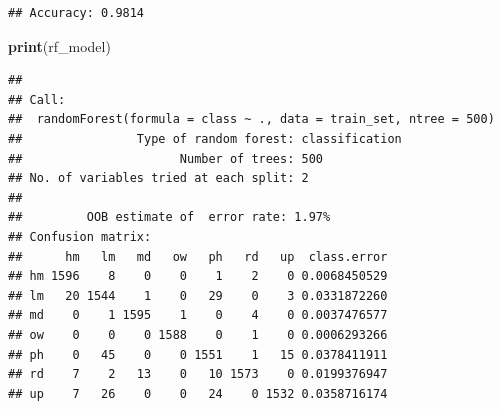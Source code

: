 \documentclass[
]{article}
\newenvironment{Shaded}{\begin{snugshade}}{\end{snugshade}}
\newcommand{\AttributeTok}[1]{\textcolor[rgb]{0.13,0.29,0.53}{#1}}
\newcommand{\CommentTok}[1]{\textcolor[rgb]{0.56,0.35,0.01}{\textit{#1}}}
\newcommand{\DecValTok}[1]{\textcolor[rgb]{0.00,0.00,0.81}{#1}}
\newcommand{\FloatTok}[1]{\textcolor[rgb]{0.00,0.00,0.81}{#1}}
\newcommand{\FunctionTok}[1]{\textcolor[rgb]{0.13,0.29,0.53}{\textbf{#1}}}
\newcommand{\NormalTok}[1]{#1}
\newcommand{\OtherTok}[1]{\textcolor[rgb]{0.56,0.35,0.01}{#1}}
\newcommand{\SpecialCharTok}[1]{\textcolor[rgb]{0.81,0.36,0.00}{\textbf{#1}}}
\newcommand{\StringTok}[1]{\textcolor[rgb]{0.31,0.60,0.02}{#1}}
\begin{document}
\begin{Shaded}
\end{Shaded}

\begin{verbatim}
## Accuracy: 0.9814
\end{verbatim}

\begin{Shaded}
\begin{Highlighting}[]
\FunctionTok{print}\NormalTok{(rf\_model)}
\end{Highlighting}
\end{Shaded}

\begin{verbatim}
## 
## Call:
##  randomForest(formula = class ~ ., data = train_set, ntree = 500) 
##                Type of random forest: classification
##                      Number of trees: 500
## No. of variables tried at each split: 2
## 
##         OOB estimate of  error rate: 1.97%
## Confusion matrix:
##      hm   lm   md   ow   ph   rd   up  class.error
## hm 1596    8    0    0    1    2    0 0.0068450529
## lm   20 1544    1    0   29    0    3 0.0331872260
## md    0    1 1595    1    0    4    0 0.0037476577
## ow    0    0    0 1588    0    1    0 0.0006293266
## ph    0   45    0    0 1551    1   15 0.0378411911
## rd    7    2   13    0   10 1573    0 0.0199376947
## up    7   26    0    0   24    0 1532 0.0358716174
\end{verbatim}
\end{document}
